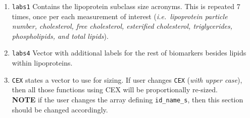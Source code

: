 \documentclass[
]{article}
\providecommand{\tightlist}{%
  \setlength{\itemsep}{0pt}\setlength{\parskip}{0pt}}
\begin{document}
\begin{enumerate}
\def\labelenumi{\arabic{enumi}.}
\tightlist
\item
  \texttt{labs1} Contains the lipoprotein subclass size acronyms. This
  is repeated 7 times, once per each measurement of interest
  (\emph{i.e.~lipoprotein particle number, cholesterol, free
  cholesterol, esterified cholesterol, triglycerides, phospholipids, and
  total lipids}).
\item
  \texttt{labs4} Vector with additional labels for the rest of
  biomarkers besides lipids within lipoproteins.
\item
  \texttt{CEX} states a vector to use for sizing. If user changes
  \texttt{CEX} (\emph{with upper case}), then all those functions using
  CEX will be proportionally re-sized.\\
  \textbf{NOTE} if the user changes the array defining
  \texttt{id\_name\_s}, then this section should be changed accordingly.
\end{enumerate}
\end{document}
